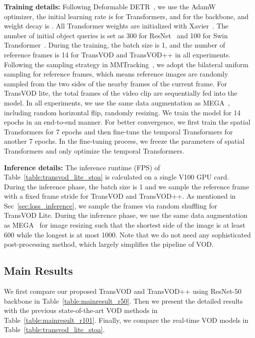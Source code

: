 \documentclass[10pt,journal,compsoc]{IEEEtran}
\begin{document}
\noindent 
\textbf{Training details:} 
Following Deformable DETR~\cite{zhu2020deformable}, we use the  AdamW~\cite{loshchilov2017decoupled} optimizer, the initial learning rate is  for Transformers, and  for the backbone, and weight decay is . All Transformer weights are initialized with Xavier~\cite{glorot2010understanding}. 
The number of initial object queries is set as 300 for ResNet~\cite{he16res} and 100 for Swin Transformer~\cite{liu2021swin}.
During the training, the batch size is 1, and
the number of reference frames is 14 for TransVOD and TransVOD++ in all experiments.
Following the sampling strategy in MMTracking~\cite{mmtrack2020}, we adopt the bilateral uniform sampling for reference frames, which means reference images are randomly
sampled from the two sides of the nearby frames of the current frame.
For TransVOD lite, the total frames of the video clip are sequentially fed into the model. In all experiments, we use the same data augmentation as MEGA~\cite{chen2020memory}, including random horizontal flip, randomly resizing. We train the model for 14 epochs in an end-to-end manner. For better convergence, we first train the spatial Transformers for 7 epochs and then fine-tune the temporal Transformers for another 7 epochs. In the fine-tuning process, we freeze the parameters of spatial Transformers and only optimize the temporal Transformers.




\noindent 
\textbf{Inference details:} 
The inference runtime (FPS) of Table~\ref{table:transvod_lite_stoa} is calculated on a single V100 GPU card. During the inference phase, the batch size is 1 and we sample the reference frame with a fixed frame stride for TransVOD and TransVOD++. As mentioned in Sec~\ref{sec:loss_inference}, we sample the frames via random shuffling for TransVOD Lite.
During the inference phase, we use the same data augmentation as MEGA~\cite{chen2020memory} for image resizing such that the shortest side of the image is at least 600 while the longest is at most 1000. 
Note that we do not need any sophisticated post-processing method, which largely simplifies the pipeline of VOD. 



\subsection{Main Results}

We first compare our proposed TransVOD and TransVOD++ using ResNet-50 backbone in Table~\ref{table:mainresult_r50}. Then we present the detailed results with the previous state-of-the-art VOD methods in Table~\ref{table:mainresult_r101}. Finally, we compare the real-time VOD models in Table~\ref{table:transvod_lite_stoa}.
\end{document}
